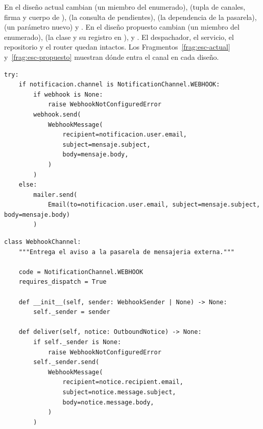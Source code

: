 \documentclass[11pt,a4paper]{article}
\begin{document}
 En el diseño actual cambian  (un miembro del enumerado),  (tupla de canales, firma y cuerpo de ),  (la consulta de pendientes),  (la dependencia de la pasarela),  (un parámetro nuevo) y . En el diseño propuesto cambian  (un miembro del enumerado),  (la clase  y su registro en ),  y . El despachador, el servicio, el repositorio y el router quedan intactos. Los Fragmentos~\ref{frag:esc-actual} y~\ref{frag:esc-propuesto} muestran dónde entra el canal en cada diseño.

\begin{lstlisting}[float=htbp,caption={\ev{E-10}. El canal nuevo en el diseño actual: una rama más en el bucle de envío (\cod{escenario\_webhook/diseno\_actual.patch}).},label=frag:esc-actual]
try:
    if notificacion.channel is NotificationChannel.WEBHOOK:
        if webhook is None:
            raise WebhookNotConfiguredError
        webhook.send(
            WebhookMessage(
                recipient=notificacion.user.email,
                subject=mensaje.subject,
                body=mensaje.body,
            )
        )
    else:
        mailer.send(
            Email(to=notificacion.user.email, subject=mensaje.subject, body=mensaje.body)
        )
\end{lstlisting}

\begin{lstlisting}[float=htbp,caption={\ev{E-10}. El canal nuevo en el diseño propuesto: una clase que cumple el contrato y se registra (\cod{escenario\_webhook/diseno\_propuesto.patch}).},label=frag:esc-propuesto]
class WebhookChannel:
    """Entrega el aviso a la pasarela de mensajeria externa."""

    code = NotificationChannel.WEBHOOK
    requires_dispatch = True

    def __init__(self, sender: WebhookSender | None) -> None:
        self._sender = sender

    def deliver(self, notice: OutboundNotice) -> None:
        if self._sender is None:
            raise WebhookNotConfiguredError
        self._sender.send(
            WebhookMessage(
                recipient=notice.recipient.email,
                subject=notice.message.subject,
                body=notice.message.body,
            )
        )
\end{lstlisting}
\end{document}

